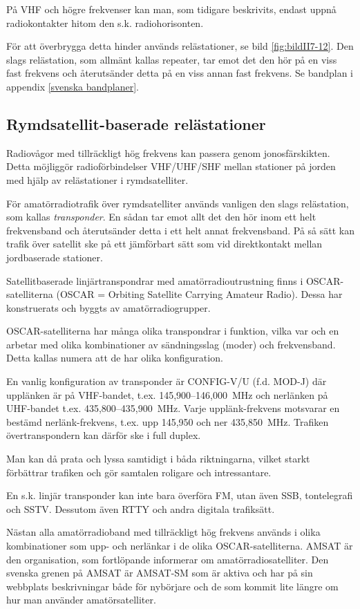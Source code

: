 På VHF och högre frekvenser kan man, som tidigare beskrivits, endast
uppnå radiokontakter hitom den s.k. radiohorisonten.

För att överbrygga detta hinder används relästationer, se bild
\ref{fig:bildII7-12}. Den slags
relästation, som allmänt kallas repeater, tar emot det den hör på en
viss fast frekvens och återutsänder detta på en viss annan fast
frekvens. Se bandplan i appendix \ref{svenska bandplaner}.

\subsection{Rymdsatellit-baserade relästationer}

Radiovågor med tillräckligt hög frekvens kan passera genom
jonosfärskikten. Detta möjliggör radioförbindelser VHF/UHF/SHF mellan
stationer på jorden med hjälp av relästationer i rymdsatelliter.

För amatörradiotrafik över rymdsatelliter används vanligen den slags
relästation, som kallas \emph{transponder}. En sådan tar emot allt det
den hör inom ett helt frekvensband och återutsänder detta i ett helt
annat frekvensband. På så sätt kan trafik över satellit ske på ett
jämförbart sätt som vid direktkontakt mellan jordbaserade stationer.

Satellitbaserade linjärtranspondrar med amatörradioutrustning finns i
OSCAR-satelliterna (OSCAR = Orbiting Satellite Carrying Amateur
Radio). Dessa har konstruerats och byggts av amatörradiogrupper.

OSCAR-satelliterna har många olika transpondrar i funktion, vilka var
och en arbetar med olika kombinationer av sändningsslag (moder) och
frekvensband. Detta kallas numera att de har olika konfiguration.

En vanlig konfiguration av transponder är CONFIG-V/U (f.d. MOD-J) där
upplänken är på VHF-bandet, t.ex. 145,900--146,000~MHz och nerlänken på
UHF-bandet t.ex. 435,800--435,900~MHz. Varje upplänk-frekvens
motsvarar en bestämd nerlänk-frekvens, t.ex. upp 145,950 och ner
435,850~MHz. Trafiken övertranspondern kan därför ske i full duplex.

Man kan då prata och lyssa samtidigt i båda riktningarna, vilket
starkt förbättrar trafiken och gör samtalen roligare och
intressantare.

En s.k. linjär transponder kan inte bara överföra FM, utan även SSB,
tontelegrafi och SSTV. Dessutom även RTTY och andra digitala
trafiksätt.

Nästan alla amatörradioband med tillräckligt hög frekvens används i
olika kombinationer som upp- och nerlänkar i de olika
OSCAR-satelliterna.
AMSAT är den organisation, som fortlöpande informerar om amatörradiosatelliter.
Den svenska grenen på AMSAT är AMSAT-SM som är aktiva och har på sin webbplats
beskrivningar både för nybörjare och de som kommit lite längre om hur man
använder amatörsatelliter.

